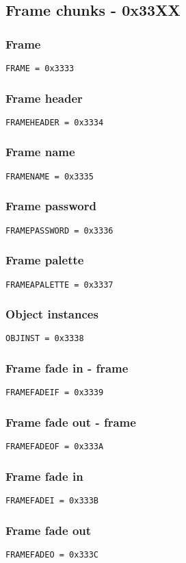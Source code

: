 \documentclass{article}
\begin{document}
\subsection{Frame chunks - 0x33XX}

\subsubsection{Frame}
\verb|FRAME = 0x3333|

\subsubsection{Frame header}
\verb|FRAMEHEADER = 0x3334|

\subsubsection{Frame name}
\verb|FRAMENAME = 0x3335|

\subsubsection{Frame password}
\verb|FRAMEPASSWORD = 0x3336|

\subsubsection{Frame palette}
\verb|FRAMEAPALETTE = 0x3337|

\subsubsection{Object instances}
\verb|OBJINST = 0x3338|

\subsubsection{Frame fade in - frame}
\verb|FRAMEFADEIF = 0x3339|

\subsubsection{Frame fade out - frame}
\verb|FRAMEFADEOF = 0x333A|

\subsubsection{Frame fade in}
\verb|FRAMEFADEI = 0x333B|

\subsubsection{Frame fade out}
\verb|FRAMEFADEO = 0x333C|
\end{document}
